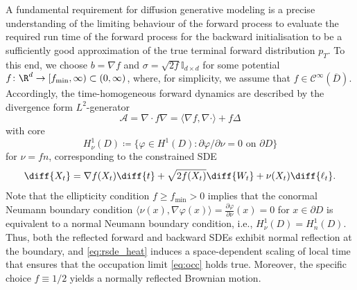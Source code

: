 \documentclass[a4paper, 11pt, headings = small, abstract]{scrartcl}
\begin{document}
A fundamental requirement for diffusion generative modeling is a precise understanding of the limiting behaviour of the forward process to evaluate the required run time of the forward process for the backward initialisation to be a sufficiently good  approximation of the true terminal forward distribution $p_T$.  To this end, we choose $b = \nabla f$ and $\sigma = \sqrt{2f} \mathbb{I}_{d \times d}$ for some potential $f\colon\R^d \to [f_{\min},\infty) \subset (0,\infty)$, where, for simplicity, we assume that $f \in \mathcal{C}^\infty(\overline{D})$. 
Accordingly, the time-homogeneous forward dynamics are described by the divergence form $L^2$-generator 
\begin{equation}\label{eq:generator}
\mathcal{A} = \nabla \cdot f \nabla = \langle \nabla f, \nabla \cdot\rangle  + f \Delta
\end{equation}
with core 
\[H^1_\nu(D) \coloneqq \{\varphi \in H^1(D) : \partial \varphi/\partial \nu = 0 \text{ on } \partial D\}\] 
for $\nu = fn$, corresponding to the constrained SDE
\begin{equation}\label{eq:rsde_heat}
\diff{X_t} = \nabla f(X_t) \diff{t} + \sqrt{2f(X_t)} \diff{W_t} + \nu(X_t)\diff{\ell_t}.
\end{equation}
Note that the ellipticity condition $f \geq f_{\min} > 0$ implies that the conormal Neumann boundary condition $\langle\nu(x), \nabla \varphi(x) \rangle = \tfrac{\partial \varphi}{\partial \nu}(x) = 0$ for $x \in \partial D$ is equivalent to a normal Neumann boundary condition, i.e., $H^1_\nu(D) = H^1_n(D)$. 
Thus, both the reflected forward and backward SDEs exhibit normal reflection at the boundary, and \eqref{eq:rsde_heat} induces a space-dependent scaling of local time that ensures that the occupation limit \eqref{eq:occ} holds true. Moreover, the specific choice $f \equiv 1/2$ yields a normally reflected Brownian motion.
\end{document}
